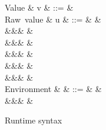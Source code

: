 \begin{figure}
\begin{syntaxfig}
\mbox{Value}
&
v
&
::=
&
\\[2mm]
\mbox{Raw value}
&
u
&
::=
&
\exTrue \mid \exFalse
&
\\
&&&
&
\\
&&&
&
\\
&&&
&
\\
&&&
\exNil
&
\\
&&&
&
\\[2mm]
\mbox{Environment}
&
\rho
&
::=
&
\envEmpty
&
\\
&&&
&
\end{syntaxfig}
\caption{Runtime syntax}
\end{figure}
